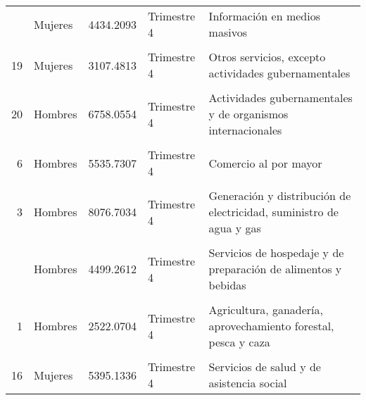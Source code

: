\documentclass{article}
\begin{document}
\begin{table}[!h]
\begin{tabular}{rlrll}
\addlinespace
9 & Mujeres & 4434.2093 & Trimestre 4 & Información en medios masivos\\
\cellcolor{gray!10}{4} & \cellcolor{gray!10}{Hombres} & \cellcolor{gray!10}{5783.9826} & \cellcolor{gray!10}{Trimestre 4} & \cellcolor{gray!10}{Construcción}\\
19 & Mujeres & 3107.4813 & Trimestre 4 & Otros servicios, excepto actividades gubernamentales\\
\cellcolor{gray!10}{20} & \cellcolor{gray!10}{Mujeres} & \cellcolor{gray!10}{6233.2241} & \cellcolor{gray!10}{Trimestre 4} & \cellcolor{gray!10}{Actividades gubernamentales y de organismos internacionales}\\
20 & Hombres & 6758.0554 & Trimestre 4 & Actividades gubernamentales y de organismos internacionales\\
\addlinespace
\cellcolor{gray!10}{14} & \cellcolor{gray!10}{Hombres} & \cellcolor{gray!10}{4418.5596} & \cellcolor{gray!10}{Trimestre 4} & \cellcolor{gray!10}{Servicios de apoyo a los negocios y manejo de desechos}\\
6 & Hombres & 5535.7307 & Trimestre 4 & Comercio al por mayor\\
\cellcolor{gray!10}{15} & \cellcolor{gray!10}{Mujeres} & \cellcolor{gray!10}{5430.9871} & \cellcolor{gray!10}{Trimestre 4} & \cellcolor{gray!10}{Servicios educativos}\\
3 & Hombres & 8076.7034 & Trimestre 4 & Generación y distribución de electricidad, suministro de agua y gas\\
\cellcolor{gray!10}{8} & \cellcolor{gray!10}{Hombres} & \cellcolor{gray!10}{5931.5389} & \cellcolor{gray!10}{Trimestre 4} & \cellcolor{gray!10}{Transportes, correos y almacenamiento}\\
\addlinespace
18 & Hombres & 4499.2612 & Trimestre 4 & Servicios de hospedaje y de preparación de alimentos y bebidas\\
\cellcolor{gray!10}{7} & \cellcolor{gray!10}{Mujeres} & \cellcolor{gray!10}{2793.5915} & \cellcolor{gray!10}{Trimestre 4} & \cellcolor{gray!10}{Comercio al por menor}\\
1 & Hombres & 2522.0704 & Trimestre 4 & Agricultura, ganadería, aprovechamiento forestal, pesca y caza\\
\cellcolor{gray!10}{12} & \cellcolor{gray!10}{Hombres} & \cellcolor{gray!10}{5491.5696} & \cellcolor{gray!10}{Trimestre 4} & \cellcolor{gray!10}{Servicios profesionales, científicos y técnicos}\\
16 & Mujeres & 5395.1336 & Trimestre 4 & Servicios de salud y de asistencia social\\

\end{tabular}
\end{table}
\end{document}
